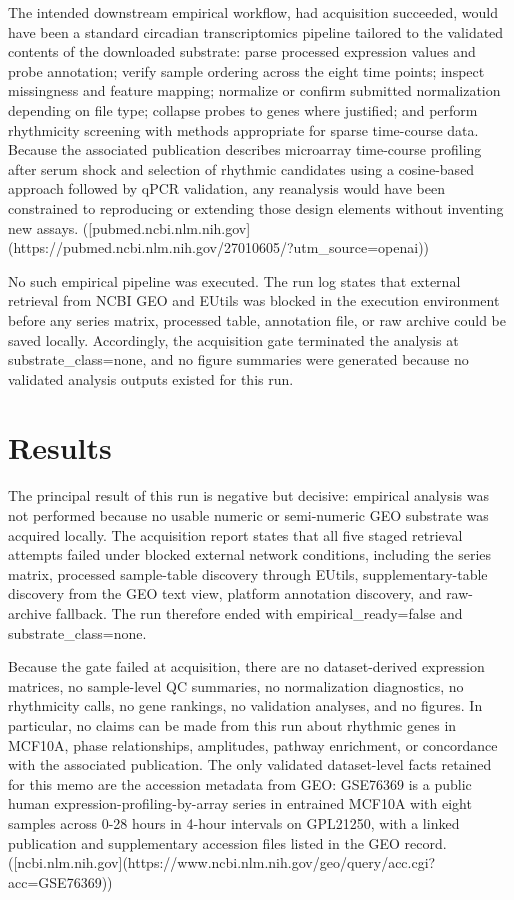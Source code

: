 \documentclass[11pt]{article}
\begin{document}
The intended downstream empirical workflow, had acquisition succeeded, would have been a standard circadian transcriptomics pipeline tailored to the validated contents of the downloaded substrate: parse processed expression values and probe annotation; verify sample ordering across the eight time points; inspect missingness and feature mapping; normalize or confirm submitted normalization depending on file type; collapse probes to genes where justified; and perform rhythmicity screening with methods appropriate for sparse time-course data. Because the associated publication describes microarray time-course profiling after serum shock and selection of rhythmic candidates using a cosine-based approach followed by qPCR validation, any reanalysis would have been constrained to reproducing or extending those design elements without inventing new assays. ([pubmed.ncbi.nlm.nih.gov](https://pubmed.ncbi.nlm.nih.gov/27010605/?utm\_source=openai))

No such empirical pipeline was executed. The run log states that external retrieval from NCBI GEO and EUtils was blocked in the execution environment before any series matrix, processed table, annotation file, or raw archive could be saved locally. Accordingly, the acquisition gate terminated the analysis at substrate\_class=none, and no figure summaries were generated because no validated analysis outputs existed for this run.

\section{Results}
The principal result of this run is negative but decisive: empirical analysis was not performed because no usable numeric or semi-numeric GEO substrate was acquired locally. The acquisition report states that all five staged retrieval attempts failed under blocked external network conditions, including the series matrix, processed sample-table discovery through EUtils, supplementary-table discovery from the GEO text view, platform annotation discovery, and raw-archive fallback. The run therefore ended with empirical\_ready=false and substrate\_class=none.

Because the gate failed at acquisition, there are no dataset-derived expression matrices, no sample-level QC summaries, no normalization diagnostics, no rhythmicity calls, no gene rankings, no validation analyses, and no figures. In particular, no claims can be made from this run about rhythmic genes in MCF10A, phase relationships, amplitudes, pathway enrichment, or concordance with the associated publication. The only validated dataset-level facts retained for this memo are the accession metadata from GEO: GSE76369 is a public human expression-profiling-by-array series in entrained MCF10A with eight samples across 0-28 hours in 4-hour intervals on GPL21250, with a linked publication and supplementary accession files listed in the GEO record. ([ncbi.nlm.nih.gov](https://www.ncbi.nlm.nih.gov/geo/query/acc.cgi?acc=GSE76369))
\end{document}
